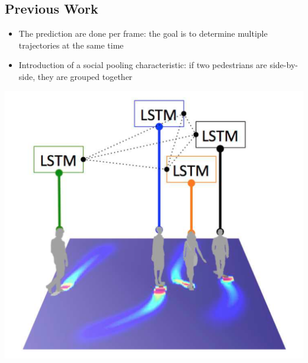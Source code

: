 \documentclass[a0,portrait]{a0poster}
\begin{document}
\begin{multicols}{2}
\section*{Previous Work \cite{Alahi}}
\begin{minipage}[]{0.6\linewidth}
\begin{itemize}
\justifying
\item The prediction are done per frame: the goal is to determine multiple trajectories at the same time
\item Introduction of a social pooling characteristic: if two pedestrians are side-by-side, they are grouped together
\end{itemize}
\end{minipage}
\hfill
\begin{minipage}[]{0.4\linewidth}
\centerline {\includegraphics[scale = 0.35]{figure/socialLSTM}}
\end{minipage}
%

\end{multicols}
\end{document}
